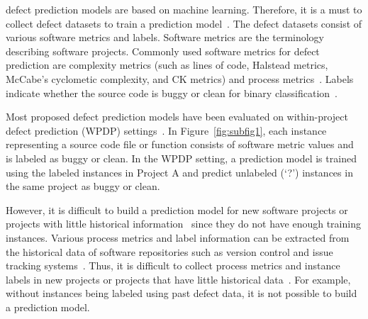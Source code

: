 
 defect prediction models are based on
machine learning. Therefore, it is a must to collect defect datasets
to train a prediction model~\cite{DAmbros12,Menzies07}. The
defect datasets consist of various software metrics and labels. Software metrics are the terminology describing software projects. Commonly
used software metrics for defect prediction are complexity metrics (such as lines of code, Halstead
metrics, McCabe's cyclometic complexity, and CK metrics) and
process metrics~\cite{Basili96,Halstead77,McCabe76,Rahman13}. Labels indicate
whether the source code is buggy or clean for binary
classification~\cite{Lee11,Nam13}.

Most proposed defect prediction models have been evaluated on
within-project defect prediction (WPDP)
settings~\cite{DAmbros12,Lee11,Menzies07}.
In Figure~\ref{fig:subfig1}, each instance representing a source code file or
function consists of software metric values and is labeled as buggy or clean.
In the WPDP setting, a prediction model is
trained using the labeled instances in Project A and predict unlabeled (`?')
instances in the same project as buggy or clean.

However, it is difficult to build a prediction model for new
software projects or projects with little historical
information~\cite{Zimmermann09} since they do not have enough training
instances. Various process metrics and label information can be extracted from
the historical data of software repositories such as version control and issue
tracking systems~\cite{Rahman13}.
Thus, it is difficult to collect process metrics and instance
labels in new projects or projects that have little historical
data~\cite{Fukushima14,Nam13,Zimmermann09}. For example, without instances being
labeled using past defect data, it is not possible to build a prediction model.



